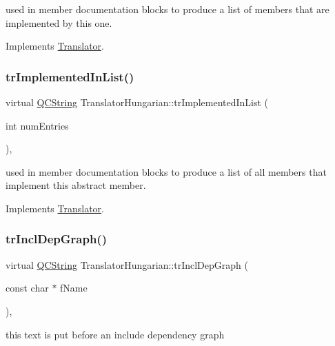 used in member documentation blocks to produce a list of members that are implemented by this one. 

Implements \mbox{\hyperlink{class_translator}{Translator}}.

\mbox{\label{class_translator_hungarian_ad3b492aa327f71075776a1fe991c6afa}} 
\subsubsection{\texorpdfstring{trImplementedInList()}{trImplementedInList()}}
{\footnotesize\ttfamily virtual \mbox{\hyperlink{class_q_c_string}{Q\+C\+String}} Translator\+Hungarian\+::tr\+Implemented\+In\+List (\begin{DoxyParamCaption}\item[{int}]{num\+Entries }\end{DoxyParamCaption})\hspace{0.3cm}{\ttfamily [inline]}, {\ttfamily [virtual]}}

used in member documentation blocks to produce a list of all members that implement this abstract member. 

Implements \mbox{\hyperlink{class_translator}{Translator}}.

\mbox{\label{class_translator_hungarian_ac658d2e81f104e0c36f64bae7e5359fc}} 
\subsubsection{\texorpdfstring{trInclDepGraph()}{trInclDepGraph()}}
{\footnotesize\ttfamily virtual \mbox{\hyperlink{class_q_c_string}{Q\+C\+String}} Translator\+Hungarian\+::tr\+Incl\+Dep\+Graph (\begin{DoxyParamCaption}\item[{const char $\ast$}]{f\+Name }\end{DoxyParamCaption})\hspace{0.3cm}{\ttfamily [inline]}, {\ttfamily [virtual]}}

this text is put before an include dependency graph 

